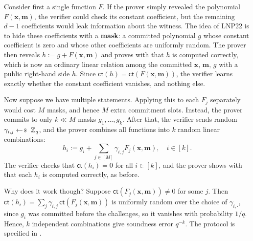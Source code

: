 \documentclass[../../book.tex]{subfiles}
\begin{document}
Consider first a single function $F$.
If the prover simply revealed the polynomial $F(\mathbf{x}, \mathbf{m})$, the verifier could check its constant coefficient, but the remaining $d-1$ coefficients would leak information about the witness.
The idea of LNP22 is to hide these coefficients with a \textbf{mask}: a committed polynomial $g$ whose constant coefficient is zero and whose other coefficients are uniformly random.
The prover then reveals $h := g + F(\mathbf{x}, \mathbf{m})$ and proves with  that $h$ is computed correctly, which is now an ordinary linear relation among the committed $\mathbf{x}$, $\mathbf{m}$, $g$ with a public right-hand side $h$.
Since $\mathsf{ct}(h) = \mathsf{ct}(F(\mathbf{x}, \mathbf{m}))$, the verifier learns exactly whether the constant coefficient vanishes, and nothing else.

Now suppose we have multiple statements. Applying this to each $F_j$ separately would cost $M$ masks, and hence $M$ extra commitment slots.
Instead, the prover commits to only $k \ll M$ masks $g_1, \dots, g_k$. After that, the verifier sends random $\gamma_{i,j} \leftarrowS \mathbb{Z}_q$, and the prover combines all functions into $k$ random linear combinations:
\begin{equation*}
    h_i := g_i + \sum_{j \in [M]} \gamma_{i,j}F_j(\mathbf{x}, \mathbf{m}), \quad i \in [k].
\end{equation*}
The verifier checks that $\mathsf{ct}(h_i) = 0$ for all $i \in [k]$, and the prover shows with  that each $h_i$ is computed correctly, as before.

Why does it work though? Suppose $\mathsf{ct}(F_j(\mathbf{x}, \mathbf{m})) \neq 0$ for some $j$. Then $\mathsf{ct}(h_i) = \sum_j \gamma_{i,j}\,\mathsf{ct}(F_j(\mathbf{x}, \mathbf{m}))$ is uniformly random over the choice of $\gamma_{i,\cdot}$, since $g_i$ was committed before the challenges, so it vanishes with probability $1/q$.
Hence, $k$ independent combinations give soundness error $q^{-k}$.
The protocol is specified in .
\end{document}
